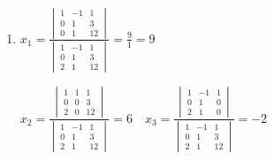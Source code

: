 	\paragraph{} %
		\begin{enumerate}
			\item %
			      \( x_{1} = \frac{
				      \begin{vmatrix}
					      1 & -1 & 1  \\
					      0 & 1  & 3  \\
					      0 & 1  & 12
				      \end{vmatrix}
			      }{
				      \begin{vmatrix}
					      1 & -1 & 1  \\
					      0 & 1  & 3  \\
					      2 & 1  & 12
				      \end{vmatrix}
			      } = \frac{9}{1} = 9 \)

			      \( x_{2} = \frac{
				      \begin{vmatrix}
					      1 & 1 & 1  \\
					      0 & 0 & 3  \\
					      2 & 0 & 12
				      \end{vmatrix}
			      }{
				      \begin{vmatrix}
					      1 & -1 & 1  \\
					      0 & 1  & 3  \\
					      2 & 1  & 12
				      \end{vmatrix}
			      } = 6 \quad x_{3} = \frac{
				      \begin{vmatrix}
					      1 & -1 & 1 \\
					      0 & 1  & 0 \\
					      2 & 1  & 0
				      \end{vmatrix}
			      }{
				      \begin{vmatrix}
					      1 & -1 & 1  \\
					      0 & 1  & 3  \\
					      2 & 1  & 12
				      \end{vmatrix}
			      } = -2 \)


\end{enumerate}
